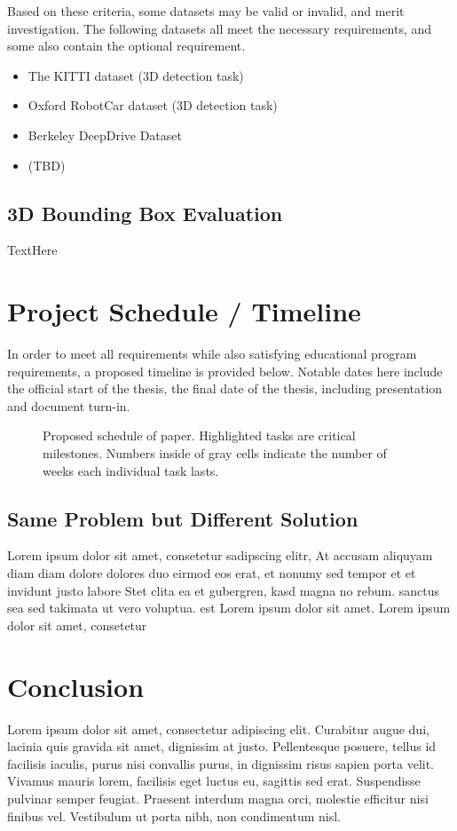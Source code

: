 Based on these criteria, some datasets may be valid or invalid, and merit investigation. The following datasets all meet the necessary requirements, and some also contain the optional requirement.
\begin{itemize} \itemsep=-0.5em
    \item The KITTI dataset (3D detection task)
    \item Oxford RobotCar dataset (3D detection task)
    \item Berkeley DeepDrive Dataset
    \item (TBD)
\end{itemize}


\subsection{3D Bounding Box Evaluation}
TextHere

\section{Project Schedule / Timeline}
In order to meet all requirements while also satisfying educational program requirements, a proposed timeline is provided below. Notable dates here include the official start of the thesis, the final date of the thesis, including presentation and document turn-in.

\begin{figure}[h] %
    \caption{Proposed schedule of paper. Highlighted tasks are critical milestones. Numbers inside of gray cells indicate the number of weeks each individual task lasts.}
\end{figure}


\subsection{Same Problem but Different Solution}
Lorem ipsum dolor sit amet, consetetur sadipscing elitr, At accusam aliquyam diam diam dolore dolores duo eirmod eos erat, et nonumy sed tempor et et invidunt justo labore Stet clita ea et gubergren, kasd magna no rebum. sanctus sea sed takimata ut vero voluptua. est Lorem ipsum dolor sit amet. Lorem ipsum dolor sit amet, consetetur\\
\section{Conclusion}
 Lorem ipsum dolor sit amet, consectetur adipiscing elit. Curabitur augue dui, lacinia quis gravida sit amet, dignissim at justo. Pellentesque posuere, tellus id facilisis iaculis, purus nisi convallis purus, in dignissim risus sapien porta velit. Vivamus mauris lorem, facilisis eget luctus eu, sagittis sed erat. Suspendisse pulvinar semper feugiat. Praesent interdum magna orci, molestie efficitur nisi finibus vel. Vestibulum ut porta nibh, non condimentum nisl.
